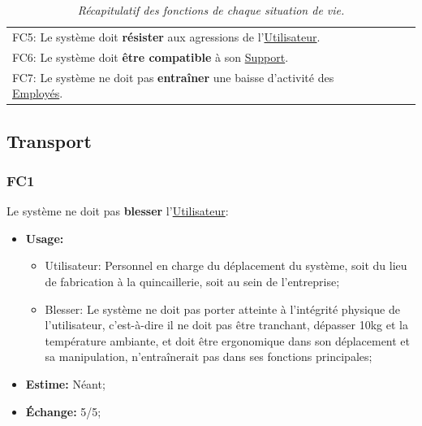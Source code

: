 \documentclass{article}
\begin{document}
\begin{table}[hbt!]
\begin{tabularx}{1\textwidth}{|X|c|c|c|c|c|c|}
		&
		&
		&
		&
		& \pageref{cat:fc4}
	\\
	\hline
		FC5: Le système doit \textbf{résister} aux agressions de
			l'\uline{Utilisateur}.
		& \cellcolor{tertiaryContainer}
		& \cellcolor{tertiaryContainer}
		& \cellcolor{tertiaryContainer}
		&
		& \cellcolor{tertiaryContainer}
		& \pageref{cat:fc5}
	\\
	\hline
		FC6: Le système doit \textbf{être compatible} à son \uline{Support}.
		& \cellcolor{tertiaryContainer}
		& \cellcolor{tertiaryContainer}
		& \cellcolor{tertiaryContainer}
		& \cellcolor{tertiaryContainer}
		& \cellcolor{tertiaryContainer}
		& \pageref{cat:fc6}
	\\
	\hline
		FC7: Le système ne doit pas \textbf{entraîner} une baisse d'activité des
			\uline{Employés}.
		&
		& \cellcolor{tertiaryContainer}
		&
		&
		&
		& \pageref{cat:fc7}
	\\
	\hline
\end{tabularx}

\caption{\textit{Récapitulatif des fonctions de chaque situation de vie.}}
\end{table}

\newpage
\subsection{Transport}

\subsubsection{FC1}\label{cat:fc1}
Le système ne doit pas \textbf{blesser} l'\uline{Utilisateur}:
\begin{itemize}
	\item \textbf{Usage:} \begin{itemize}
		\item Utilisateur: Personnel en charge du déplacement du système, soit
			  du lieu de fabrication à la quincaillerie, soit au sein de
			  l'entreprise;
		\item Blesser: Le système ne doit pas porter atteinte à l'intégrité
			  physique de l'utilisateur, c'est-à-dire il ne doit pas être
			  tranchant, dépasser 10kg et la température ambiante, et doit être
			  ergonomique dans son déplacement et sa manipulation,
			  n'entraînerait pas dans ses fonctions principales;
	\end{itemize}
	\item \textbf{Estime:} Néant;
	\item \textbf{Échange:} 5/5;
\end{itemize}
\end{document}
